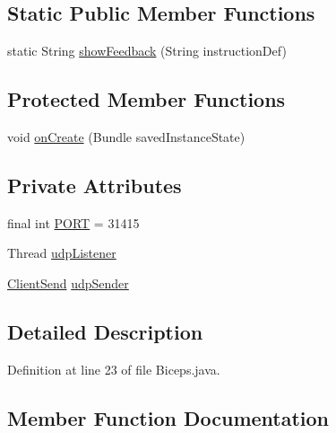\subsection*{Static Public Member Functions}
\begin{DoxyCompactItemize}
\item 
static String \mbox{\hyperlink{classcom_1_1example_1_1trainawearapplication_1_1_biceps_ad9e0fdf8309b31736b338a3b29079b24}{show\+Feedback}} (String instruction\+Def)
\end{DoxyCompactItemize}
\subsection*{Protected Member Functions}
\begin{DoxyCompactItemize}
\item 
void \mbox{\hyperlink{classcom_1_1example_1_1trainawearapplication_1_1_biceps_abcdfd60742e9da12033fad625275ca4f}{on\+Create}} (Bundle saved\+Instance\+State)
\end{DoxyCompactItemize}
\subsection*{Private Attributes}
\begin{DoxyCompactItemize}
\item 
final int \mbox{\hyperlink{classcom_1_1example_1_1trainawearapplication_1_1_biceps_adb998a91a1fac06d100f9c192df14bbe}{P\+O\+RT}} = 31415
\item 
Thread \mbox{\hyperlink{classcom_1_1example_1_1trainawearapplication_1_1_biceps_a066fa540c01d0299cab5c4a1a2cf2f5f}{udp\+Listener}}
\item 
\mbox{\hyperlink{classcom_1_1example_1_1trainawearapplication_1_1_client_send}{Client\+Send}} \mbox{\hyperlink{classcom_1_1example_1_1trainawearapplication_1_1_biceps_acfb63670051beb8e048beea485e8576a}{udp\+Sender}}
\end{DoxyCompactItemize}


\subsection{Detailed Description}


Definition at line 23 of file Biceps.\+java.



\subsection{Member Function Documentation}
\mbox{\label{classcom_1_1example_1_1trainawearapplication_1_1_biceps_abcdfd60742e9da12033fad625275ca4f}} 
